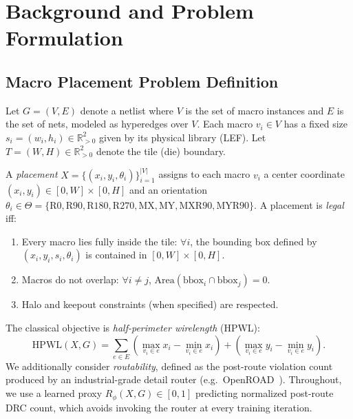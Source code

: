 
\section{Background and Problem Formulation}
\label{sec:background}

\subsection{Macro Placement Problem Definition}

Let $G = (V, E)$ denote a netlist where $V$ is the set of macro instances and $E$ is the set of nets, modeled as hyperedges over $V$. Each macro $v_i \in V$ has a fixed size $s_i = (w_i, h_i) \in \mathbb{R}^2_{>0}$ given by its physical library (LEF). Let $T = (W, H) \in \mathbb{R}^2_{>0}$ denote the tile (die) boundary.

A \emph{placement} $X = \{(x_i, y_i, \theta_i)\}_{i=1}^{|V|}$ assigns to each macro $v_i$ a center coordinate $(x_i, y_i) \in [0, W] \times [0, H]$ and an orientation $\theta_i \in \Theta = \{\textrm{R0}, \textrm{R90}, \textrm{R180}, \textrm{R270}, \textrm{MX}, \textrm{MY}, \textrm{MXR90}, \textrm{MYR90}\}$. A placement is \emph{legal} iff:
\begin{enumerate}
\item Every macro lies fully inside the tile: $\forall i$, the bounding box defined by $(x_i, y_i, s_i, \theta_i)$ is contained in $[0, W] \times [0, H]$.
\item Macros do not overlap: $\forall i \neq j$, $\textrm{Area}(\textrm{bbox}_i \cap \textrm{bbox}_j) = 0$.
\item Halo and keepout constraints (when specified) are respected.
\end{enumerate}

The classical objective is \emph{half-perimeter wirelength} (HPWL):
\begin{equation}
\textrm{HPWL}(X, G) = \sum_{e \in E} \left( \max_{v_i \in e} x_i - \min_{v_i \in e} x_i \right) + \left( \max_{v_i \in e} y_i - \min_{v_i \in e} y_i \right).
\label{eq:hpwl}
\end{equation}
We additionally consider \emph{routability}, defined as the post-route violation count produced by an industrial-grade detail router (e.g.\ OpenROAD~\cite{openroad}). Throughout, we use a learned proxy $R_\phi(X, G) \in [0, 1]$ predicting normalized post-route DRC count, which avoids invoking the router at every training iteration.

